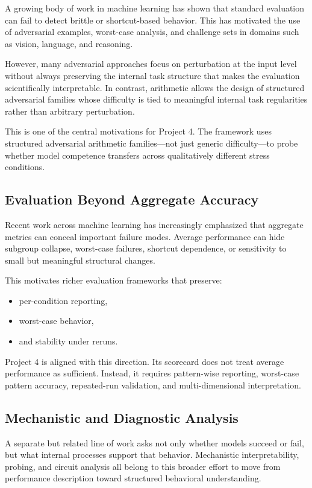 \documentclass[11pt]{article}
\begin{document}
A growing body of work in machine learning has shown that standard evaluation can fail to detect brittle or shortcut-based behavior. This has motivated the use of adversarial examples, worst-case analysis, and challenge sets in domains such as vision, language, and reasoning.

However, many adversarial approaches focus on perturbation at the input level without always preserving the internal task structure that makes the evaluation scientifically interpretable. In contrast, arithmetic allows the design of structured adversarial families whose difficulty is tied to meaningful internal task regularities rather than arbitrary perturbation.

This is one of the central motivations for Project 4. The framework uses structured adversarial arithmetic families—not just generic difficulty—to probe whether model competence transfers across qualitatively different stress conditions.

\subsection{Evaluation Beyond Aggregate Accuracy}

Recent work across machine learning has increasingly emphasized that aggregate metrics can conceal important failure modes. Average performance can hide subgroup collapse, worst-case failures, shortcut dependence, or sensitivity to small but meaningful structural changes.

This motivates richer evaluation frameworks that preserve:
\begin{itemize}[leftmargin=1.5em]
    \item per-condition reporting,
    \item worst-case behavior,
    \item and stability under reruns.
\end{itemize}

Project 4 is aligned with this direction. Its scorecard does not treat average performance as sufficient. Instead, it requires pattern-wise reporting, worst-case pattern accuracy, repeated-run validation, and multi-dimensional interpretation.

\subsection{Mechanistic and Diagnostic Analysis}

A separate but related line of work asks not only whether models succeed or fail, but what internal processes support that behavior. Mechanistic interpretability, probing, and circuit analysis all belong to this broader effort to move from performance description toward structured behavioral understanding.
\end{document}
